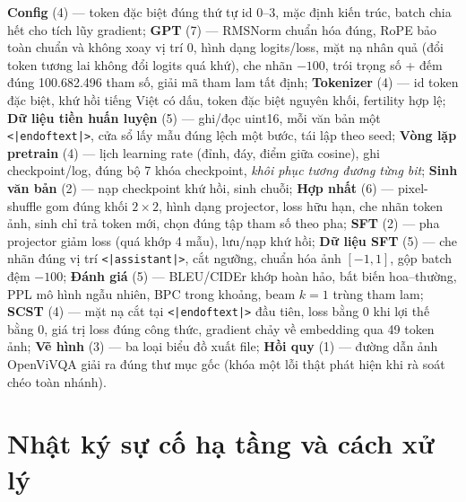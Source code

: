 \textbf{Config} (4) --- token đặc biệt đúng thứ tự id 0--3, mặc định kiến
trúc, batch chia hết cho tích lũy gradient; \textbf{GPT} (7) --- RMSNorm
chuẩn hóa đúng, RoPE bảo toàn chuẩn và không xoay vị trí 0, hình dạng
logits/loss, mặt nạ nhân quả (đổi token tương lai không đổi logits quá khứ),
che nhãn $-100$, trói trọng số + đếm đúng 100.682.496 tham số, giải mã tham
lam tất định; \textbf{Tokenizer} (4) --- id token đặc biệt, khứ hồi tiếng
Việt có dấu, token đặc biệt nguyên khối, fertility hợp lệ; \textbf{Dữ liệu
tiền huấn luyện} (5) --- ghi/đọc uint16, mỗi văn bản một \texttt{<|endoftext|>},
cửa sổ lấy mẫu đúng lệch một bước, tái lập theo seed; \textbf{Vòng lặp
pretrain} (4) --- lịch learning rate (đỉnh, đáy, điểm giữa cosine), ghi
checkpoint/log, đúng bộ 7 khóa checkpoint, \emph{khôi phục tương đương từng
bit}; \textbf{Sinh văn bản} (2) --- nạp checkpoint khứ hồi, sinh chuỗi;
\textbf{Hợp nhất} (6) --- pixel-shuffle gom đúng khối $2 \times 2$, hình dạng
projector, loss hữu hạn, che nhãn token ảnh, sinh chỉ trả token mới, chọn
đúng tập tham số theo pha; \textbf{SFT} (2) --- pha projector giảm loss
(quá khớp 4 mẫu), lưu/nạp khứ hồi; \textbf{Dữ liệu SFT} (5) --- che nhãn đúng
vị trí \texttt{<|assistant|>}, cắt ngưỡng, chuẩn hóa ảnh $[-1,1]$, gộp batch
đệm $-100$; \textbf{Đánh giá} (5) --- BLEU/CIDEr khớp hoàn hảo, bất biến
hoa--thường, PPL mô hình ngẫu nhiên, BPC trong khoảng, beam $k{=}1$ trùng
tham lam; \textbf{SCST} (4) --- mặt nạ cắt tại \texttt{<|endoftext|>} đầu
tiên, loss bằng 0 khi lợi thế bằng 0, giá trị loss đúng công thức, gradient
chảy về embedding qua 49 token ảnh; \textbf{Vẽ hình} (3) --- ba loại biểu đồ
xuất file; \textbf{Hồi quy} (1) --- đường dẫn ảnh OpenViVQA giải ra đúng
thư mục gốc (khóa một lỗi thật phát hiện khi rà soát chéo toàn nhánh).

\section{Nhật ký sự cố hạ tầng và cách xử lý}
\label{app:incidents}

